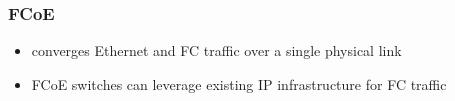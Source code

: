 	\subsubsection{FCoE} %
	\label{ssub:fcoe}
		\begin{itemize}
			\item converges Ethernet and FC traffic over a single physical link
			\item FCoE switches can leverage existing IP infrastructure for FC traffic
		\end{itemize}



